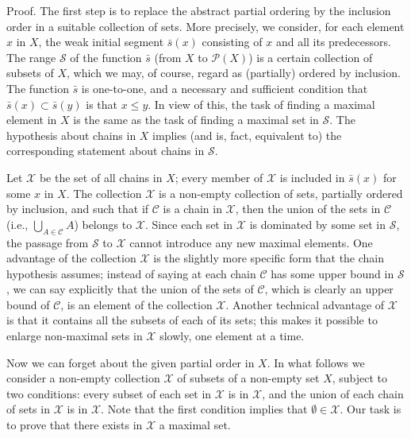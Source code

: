 Proof. The first step is to replace the abstract partial ordering by the inclusion order in a suitable collection of sets. More precisely, we consider, for each element $x$ in $X$, the weak initial segment $\bar{s}(x)$ consisting of $x$ and all its predecessors. The range $\mathcal{S}$ of the function $\bar{s}$ (from $X$ to $\mathcal{P}(X)$) is a certain collection of subsets of $X$, which we may, of course, regard as (partially) ordered by inclusion. The function $\bar{s}$ is one-to-one, and a necessary and sufficient condition that $\bar{s}(x) \subset \bar{s}(y)$ is that $x \le y$. In view of this, the task of finding a maximal element in $X$ is the same as the task of finding a maximal set in $\mathcal{S}$. The hypothesis about chains in $X$ implies (and is, fact, equivalent to) the corresponding statement about chains in $\mathcal{S}$. 

Let $\mathcal{X}$ be the set of all chains in $X$; every member of $\mathcal{X}$ is included in $\bar{s}(x)$ for some $x$ in $X$. The collection $\mathcal{X}$ is a non-empty collection of sets, partially ordered by inclusion, and such that if $\mathcal{C}$ is a chain in $\mathcal{X}$, then the union of the sets in $\mathcal{C}$ (i.e., $\bigcup_{A \in \mathcal{C}} A$) belongs to $\mathcal{X}$. Since each set in $\mathcal{X}$ is dominated by some set in $\mathcal{S}$, the passage from $\mathcal{S}$ to $\mathcal{X}$ cannot introduce any new maximal elements. One advantage of the collection $\mathcal{X}$ is the slightly more specific form that the chain hypothesis assumes; instead of saying at each chain $\mathcal{C}$ has some upper bound in $\mathcal{S}$, we can say explicitly that the union of the sets of $\mathcal{C}$, which is clearly an upper bound of $\mathcal{C}$, is an element of the collection $\mathcal{X}$. Another technical advantage of $\mathcal{X}$ is that it contains all the subsets of each of its sets; this makes it possible to enlarge non-maximal sets in $\mathcal{X}$ slowly, one element at a time. 

Now we can forget about the given partial order in $X$. In what follows we consider a non-empty collection $\mathcal{X}$ of subsets of a non-empty set $X$, subject to two conditions: every subset of each set in $\mathcal{X}$ is in $\mathcal{X}$, and the union of each chain of sets in $\mathcal{X}$ is in $\mathcal{X}$. Note that the first condition implies that $\emptyset \in \mathcal{X}$. Our task is to prove that there exists in $\mathcal{X}$ a maximal set. 

